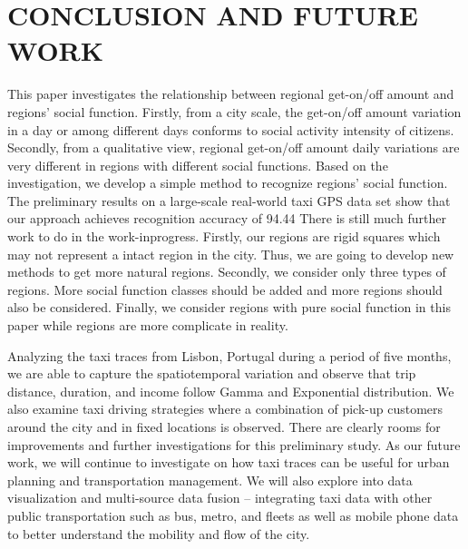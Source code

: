\documentclass[a4paper, 10pt, conference]{ieeeconf}      %
\begin{document}
\section{CONCLUSION AND FUTURE WORK}%
This paper investigates the relationship between regional get-on/off amount and regions’ social function. Firstly, from a city scale, the get-on/off amount variation in a day or among different days conforms to social activity intensity of citizens. Secondly, from a qualitative view, regional get-on/off amount daily variations are very different in regions with different social functions.
Based on the investigation, we develop a simple method to recognize regions’ social function. The preliminary results on a large-scale real-world taxi GPS data set show that our approach achieves recognition accuracy of 94.44%
There is still much further work to do in the work-inprogress. Firstly, our regions are rigid squares which may not represent a intact region in the city. Thus, we are going to develop new methods to get more natural regions. Secondly, we consider only three types of regions. More social function classes should be added and more regions should also be considered. Finally, we consider regions with pure social function in this paper while regions are more complicate in reality.


Analyzing the taxi traces from Lisbon, Portugal during a period of five months, we are able to capture the spatiotemporal variation and observe that trip distance, duration, and income follow Gamma and Exponential distribution. We also examine taxi driving strategies where a combination of pick-up customers around the city and in fixed locations is observed. There are clearly rooms for improvements and further investigations for this preliminary study. As our future work, we will continue to investigate on how taxi traces can be useful for urban planning and transportation management. We will also explore into data visualization and multi-source data fusion – integrating taxi data with other public transportation such as bus, metro, and fleets as well as mobile phone data to better understand the mobility and flow of the city. 

\addtolength{\textheight}{-12cm}   %
\end{document}
